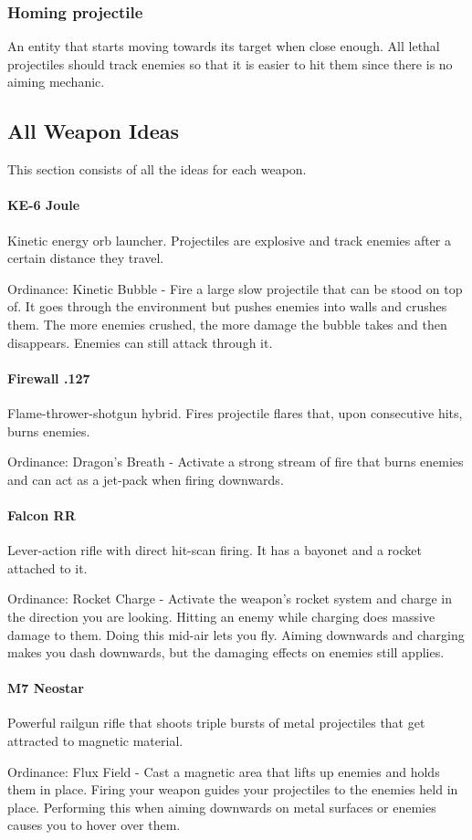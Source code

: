 \documentclass[../Main.tex]{subfiles}
\begin{document}
\subsubsection{Homing projectile}

An entity that starts moving towards its target when close enough. All lethal projectiles should track enemies so that it is easier to hit them since there is no aiming mechanic.

\subsection{All Weapon Ideas}

This section consists of all the ideas for each weapon.

\paragraph{KE-6 Joule}

Kinetic energy orb launcher. Projectiles are explosive and track enemies after a certain distance they travel. 

Ordinance: Kinetic Bubble - Fire a large slow projectile that can be stood on top of. It goes through the environment but pushes enemies into walls and crushes them. The more enemies crushed, the more damage the bubble takes and then disappears. Enemies can still attack through it.

\paragraph{Firewall .127}

Flame-thrower-shotgun hybrid. Fires projectile flares that, upon consecutive hits, burns enemies.

Ordinance: Dragon's Breath - Activate a strong stream of fire that burns enemies and can act as a jet-pack when firing downwards.

\paragraph{Falcon RR}

Lever-action rifle with direct hit-scan firing. It has a bayonet and a rocket attached to it.

Ordinance: Rocket Charge - Activate the weapon's rocket system and charge in the direction you are looking. Hitting an enemy while charging does massive damage to them. Doing this mid-air lets you fly. Aiming downwards and charging makes you dash downwards, but the damaging effects on enemies still applies.

\paragraph{M7 Neostar}

Powerful railgun rifle that shoots triple bursts of metal projectiles that get attracted to magnetic material.

Ordinance: Flux Field - Cast a magnetic area that lifts up enemies and holds them in place. Firing your weapon guides your projectiles to the enemies held in place. Performing this when aiming downwards on metal surfaces or enemies causes you to hover over them.
\end{document}
